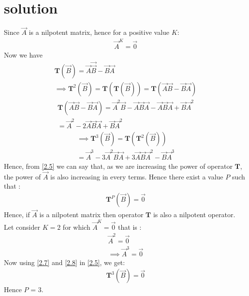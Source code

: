 \documentclass[journal,12pt,twocolumn]{IEEEtran}
\begin{document}
	\section{solution}
	Since $\vec{A}$ is a nilpotent  matrix, hence for a positive value $K$:
	\begin{align}
	\vec{A}^K = \vec{0}
	\end{align} 
	Now we have 
	\begin{align}
	\mathbf{T}(\vec{B}) = \vec{A}\vec{\vec{B}} - \vec{B}\vec{A}\\
	\implies  \mathbf{T}^2(\vec{B}) = \mathbf{T}(\mathbf{T}(\vec{B})) =\mathbf{T}(\vec{A}\vec{B} -\vec{B}\vec{A})\label{2.3}	
	\end{align}
	\begin{multline}
	\mathbf{T}(\vec{A}\vec{B} -\vec{B}\vec{A}) = \vec{A}^2\vec{B} - \vec{A}\vec{B}\vec{A} -\vec{A}\vec{B}\vec{A} + \vec{B}\vec{A}^2 \\= \vec{A}^2 -2\vec{A}\vec{B}\vec{A} +\vec{B}\vec{A}^2
	\end{multline}
	\begin{multline}
	\implies\mathbf{T}^3(\vec{B}) = \mathbf{T}(\mathbf{T}^2(\vec{B})) \\= \vec{A}^3 - 3\vec{A}^2\vec{B}\vec{A} + 3\vec{A}\vec{B}\vec{A}^2 - \vec{B}\vec{A}^3 \label{2.5}
	\end{multline}
	Hence, from \eqref{2.5} we can say that, as we are increasing the power of operator $\mathbf{T}$, the power of $\vec{A}$ is also increasing in every terms. Hence there exist   a value $P$  such that :
	\begin{align}
	\mathbf{T}^P (\vec{B})= \vec{0} 
	\end{align} 
	Hence, if $\vec{A}$ is a nilpotent matrix then operator $\mathbf{T}$ is also a nilpotent operator.\\
	Let consider $K = 2$ for which $\vec{A}^K = \vec{0}$ that is :
	\begin{align}
	\vec{A}^2 = \vec{0} \label{2.7}\\
\implies	\vec{A}^3 = \vec{0} \label{2.8}
	\end{align} 
	Now using \eqref{2.7} and \eqref{2.8} in \eqref{2.5}, we get:
	\begin{align}
	\mathbf{T}^3(\vec{B}) = \vec{0}
	\end{align}
	Hence $P$ = 3.
\end{document}
